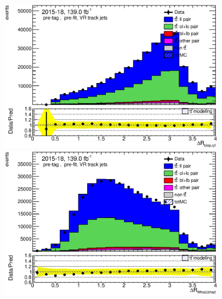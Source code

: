 \documentclass[letterpaper,12pt]{article}
\begin{document}
\begin{figure}[H]
\begin{minipage}[b]{.45\textwidth}
	\end{minipage}\hfill
	\begin{minipage}[b]{.45\textwidth}
	\centering
	\includegraphics[width=1\textwidth]{Oct_distributions/pretagNoRwDL1rwithhighpTVRJets_scaledall/DataMC_dRblepq1.eps} 
	\end{minipage}\hfill
	\begin{minipage}[b]{.45\textwidth}
	\centering
	\includegraphics[width=1\textwidth]{Oct_distributions/pretagNoRwDL1rwithhighpTVRJets_scaledall/DataMC_dRWhadbhad.eps} 
	\end{minipage}\hfill
	\begin{minipage}[b]{.45\textwidth}
	\centering

\end{minipage}
\end{figure}
\end{document}
